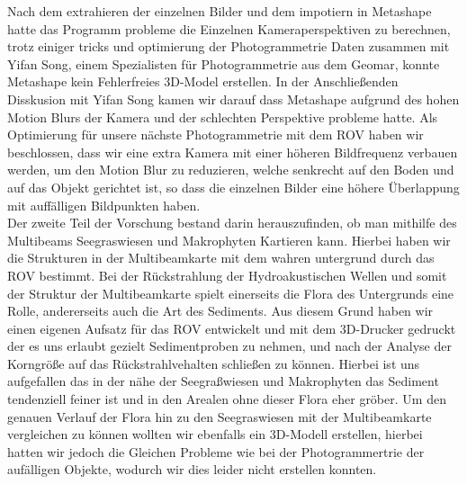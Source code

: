 Nach dem extrahieren der einzelnen Bilder und dem impotiern in Metashape hatte das Programm probleme die Einzelnen Kameraperspektiven zu berechnen, trotz einiger tricks und optimierung der Photogrammetrie Daten zusammen mit Yifan Song, einem Spezialisten für Photogrammetrie aus dem Geomar, konnte Metashape kein Fehlerfreies 3D-Model erstellen.
In der Anschließenden Disskusion mit Yifan Song kamen wir darauf dass Metashape aufgrund des hohen Motion Blurs der Kamera und der schlechten Perspektive probleme hatte. 
Als Optimierung für unsere nächste Photogrammetrie mit dem ROV haben wir beschlossen, dass wir eine extra Kamera mit einer höheren Bildfrequenz verbauen werden, um den Motion Blur zu reduzieren, welche senkrecht auf den Boden und auf das Objekt gerichtet ist, so dass die einzelnen Bilder eine höhere Überlappung mit auffälligen Bildpunkten haben.
\\

Der zweite Teil der Vorschung bestand darin herauszufinden, ob man mithilfe des Multibeams Seegraswiesen und Makrophyten Kartieren kann. Hierbei haben wir die Strukturen in der Multibeamkarte mit dem wahren untergrund durch das ROV bestimmt.
Bei der Rückstrahlung der Hydroakustischen Wellen und somit der Struktur der Multibeamkarte spielt einerseits die Flora des Untergrunds eine Rolle, andererseits auch die Art des Sediments.
Aus diesem Grund haben wir einen eigenen Aufsatz für das ROV entwickelt und mit dem 3D-Drucker gedruckt der es uns erlaubt gezielt Sedimentproben zu nehmen, und nach der Analyse der Korngröße auf das Rückstrahlvehalten schließen zu können.
Hierbei ist uns aufgefallen das in der nähe der Seegraßwiesen und Makrophyten das Sediment tendenziell feiner ist und in den Arealen ohne dieser Flora eher gröber.
Um den genauen Verlauf der Flora hin zu den Seegraswiesen mit der Multibeamkarte vergleichen zu können wollten wir ebenfalls ein 3D-Modell erstellen, hierbei hatten wir jedoch die Gleichen Probleme wie bei der Photogrammertrie der aufälligen Objekte, wodurch wir dies leider nicht erstellen konnten.

